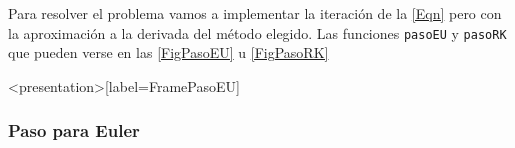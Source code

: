 Para resolver el problema vamos a implementar la iteración de la \autoref{Eqn}
pero con la aproximación a la derivada del método elegido. 
Las funciones \texttt{pasoEU} y \texttt{pasoRK} que pueden verse
en las  \autoref{FigPasoEU} u \autoref{FigPasoRK} 

\begin{frame}<presentation>[label=FramePasoEU]
  \frametitle{Paso para Euler}
  \begin{tikzpicture}

  \end{tikzpicture}

\end{frame}


\begin{figure}
  \caption{\protect\label{FigPasoRK}}
\end{figure}
